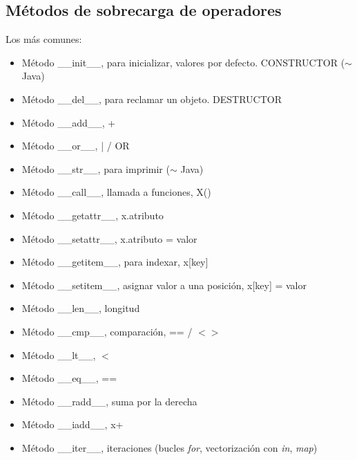 	\subsection{Métodos de sobrecarga de operadores}
	\noindent Los más comunes:
	\begin{itemize}
	\item Método \_\_init\_\_, para inicializar, valores por defecto. CONSTRUCTOR ($\sim$ Java)
	\item Método \_\_del\_\_, para reclamar un objeto. DESTRUCTOR
	\item Método \_\_add\_\_, +
	\item Método \_\_or\_\_, | / OR
	\item Método \_\_str\_\_, para imprimir ($\sim$ Java) 
	\item Método \_\_call\_\_, llamada a funciones, X()	
	\item Método \_\_getattr\_\_, x.atributo  
	\item Método \_\_setattr\_\_, x.atributo = valor
	\item Método \_\_getitem\_\_, para indexar, x[key] 
	\item Método \_\_setitem\_\_, asignar valor a una posición, x[key] = valor 
	\item Método \_\_len\_\_, longitud
	\item Método \_\_cmp\_\_, comparación, == / $< >$ 
 	\item Método \_\_lt\_\_, $ < $
	\item Método \_\_eq\_\_, ==
	\item Método \_\_radd\_\_, suma por la derecha
	\item Método \_\_iadd\_\_, x+
	\item Método \_\_iter\_\_, iteraciones (bucles \textit{for}, vectorización con \textit{in}, \textit{map})    
	\end{itemize}